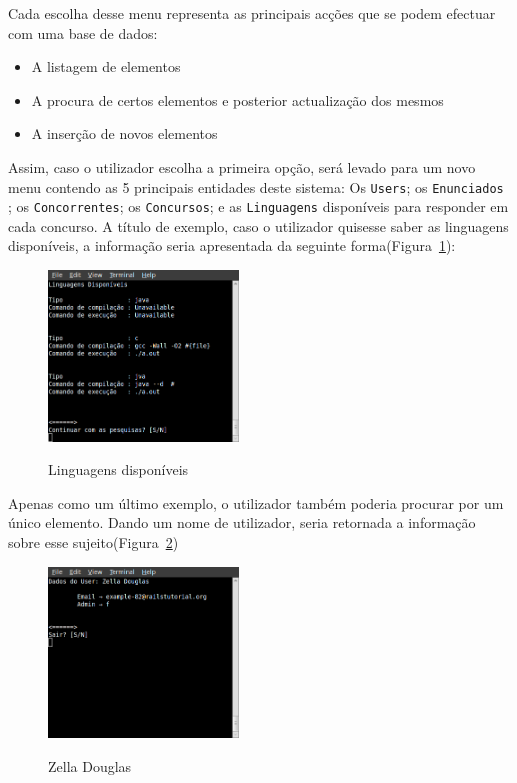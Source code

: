 Cada escolha desse menu representa as principais acções que se podem efectuar com uma base de dados: 

\begin{itemize}
 \item A listagem de elementos
 \item A procura de certos elementos e posterior actualização dos mesmos
 \item A inserção de novos elementos
\end{itemize}

Assim, caso o utilizador escolha a primeira opção, será levado para um novo menu contendo as 5 principais entidades deste sistema: Os \texttt{Users}; os \texttt{Enunciados}
; os \texttt{Concorrentes}; os \texttt{Concursos}; e as \texttt{Linguagens} disponíveis para responder em cada concurso. A título de exemplo, caso o utilizador quisesse saber 
as linguagens disponíveis, a informação seria apresentada da seguinte forma(Figura~\ref{img linguagens}):\\

\begin{figure}[H]
\begin{center}
\includegraphics[width=0.45\textwidth]{Images/linguagens}\label{img linguagens}
\caption{Linguagens disponíveis}
\end{center}
\end{figure} 

Apenas como um último exemplo, o utilizador também poderia procurar por um único elemento. Dando um nome de utilizador, seria retornada a informação sobre esse 
sujeito(Figura~\ref{img zelladouglas})\\

\begin{figure}[H]
\begin{center}
\includegraphics[width=0.45\textwidth]{Images/zelladouglas}\label{img zelladouglas}
\caption{Zella Douglas}
\end{center}
\end{figure} 
